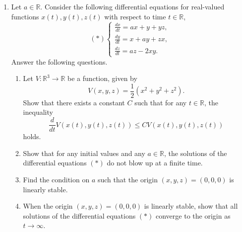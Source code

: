 \documentclass{article}
\begin{document}
\begin{enumerate}[label=\fbox{\arabic*}]
\begin{enumerate}[label=(\arabic*)]
\[                \]
                Show that there exist a constant $C \in (0, \infty)$ and $\phi \in Y$ such that
                \[
                  |w(t, x) - \phi(x)| \le C e^{-3t}
                \]
                for any $(t, x) \in [0, \infty) \times [0, \pi]$.
        \end{enumerate}

  \item Let $a \in \mathbb{R}$. Consider the following differential equations for real-valued functions $x(t), y(t), z(t)$ with respect to time $t \in \mathbb{R}$,
        \[
          (*) \begin{cases} \frac{dx}{dt} = ax + y + yz, \\ \frac{dy}{dt} = x + ay + zx, \\ \frac{dz}{dt} = az - 2xy. \end{cases}
        \]
        Answer the following questions.
        \begin{enumerate}[label=(\arabic*)]
          \item Let $V: \mathbb{R}^3 \to \mathbb{R}$ be a function, given by
                \[
                  V(x, y, z) = \frac{1}{2}(x^2 + y^2 + z^2).
                \]
                Show that there exists a constant $C$ such that for any $t \in \mathbb{R}$, the inequality
                \[
                  \frac{d}{dt}V(x(t), y(t), z(t)) \le CV(x(t), y(t), z(t))
                \]
                holds.
          \item Show that for any initial values and any $a \in \mathbb{R}$, the solutions of the differential equations $(*)$ do not blow up at a finite time.
          \item Find the condition on $a$ such that the origin $(x, y, z) = (0, 0, 0)$ is linearly stable.
          \item When the origin $(x, y, z) = (0, 0, 0)$ is linearly stable, show that all solutions of the differential equations $(*)$ converge to the origin as $t \to \infty$.
        \end{enumerate}


\end{enumerate}
\end{document}
